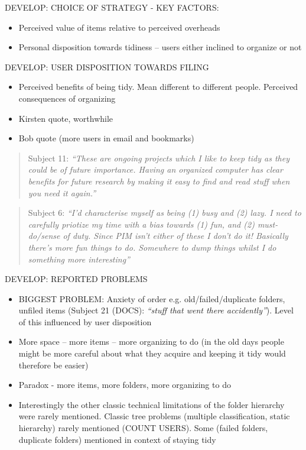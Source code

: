 \noindent
DEVELOP: CHOICE OF STRATEGY - KEY FACTORS:
\begin{itemize}
	\item Perceived value of items relative to perceived overheads
	\item Personal disposition towards tidiness -- users either inclined to organize or not
\end{itemize}

\noindent
DEVELOP: USER DISPOSITION TOWARDS FILING
\begin{itemize}
	\item Perceived benefits of being tidy. Mean different to different people. Perceived consequences of organizing
	\item Kirsten quote, worthwhile
	\item Bob quote (more users in email and bookmarks)
\end{itemize}

\begin{quote}
	Subject 11: \textit{``These are ongoing projects which I like to keep tidy as they could be of future importance. Having an organized computer has clear benefits for future research by making it easy to find and read stuff when you need it again.''}
\end{quote}
\begin{quote}
	Subject 6: \textit{``I'd characterise myself as being (1) busy and (2) lazy. I need to carefully priotize my time with a bias towards (1) fun, and (2) must-do/sense of duty.  Since PIM isn't either of these I don't do it!  Basically there's more fun things to do. Somewhere to dump things whilst I do something more interesting''}
\end{quote}

\noindent
DEVELOP: REPORTED PROBLEMS
\begin{itemize}
	\item BIGGEST PROBLEM: Anxiety of order e.g. old/failed/duplicate folders, unfiled items (Subject 21 (DOCS): \textit{``stuff that went there accidently''}). Level of this influenced by user disposition
	\item More space -- more items -- more organizing to do (in the old days people might be more careful about what they acquire and keeping it tidy would therefore be easier)
	\item Paradox - more items, more folders, more organizing to do
	\item Interestingly the other classic technical limitations of the folder hierarchy were rarely mentioned. Classic tree problems (multiple classification, static hierarchy) rarely mentioned (COUNT USERS). Some (failed folders, duplicate folders) mentioned in context of staying tidy
\end{itemize}

